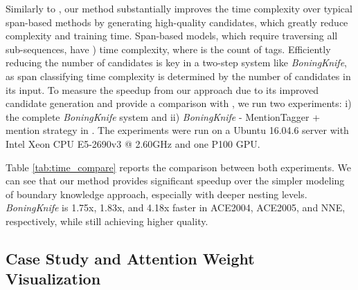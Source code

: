 \documentclass[11pt,a4paper]{article}
\begin{document}
Similarly to \citet{tan2020boundary}, our method substantially improves the time complexity over typical span-based methods by generating high-quality candidates, which greatly reduce complexity and training time. 
Span-based models, which require traversing all sub-sequences, have 
) time complexity, where  is the count of tags. 
Efficiently reducing the number of candidates is key in a two-step system like \textit{BoningKnife}, as span classifying time complexity is determined by the number of candidates in its input. 
To measure the speedup from our approach due to its improved candidate generation and provide a comparison with \citet{tan2020boundary}, we run two experiments: i) the complete \textit{BoningKnife} system and ii) \textit{BoningKnife} - MentionTagger + mention strategy in \citet{tan2020boundary}. The experiments were run on a Ubuntu 16.04.6 server with Intel Xeon CPU E5-2690v3 @ 2.60GHz
and one P100 GPU.




Table \ref{tab:time_compare} reports the comparison between both experiments. We can see that our method provides significant speedup over the simpler modeling of boundary knowledge approach, especially with deeper nesting levels. \textit{BoningKnife} is 1.75x, 1.83x, and 4.18x faster in ACE2004, ACE2005, and NNE, respectively, while still achieving higher quality.




\subsection{Case Study and Attention Weight Visualization}
\label{sec:case_study}
\end{document}
